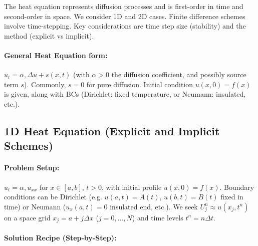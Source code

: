 \documentclass[a4paper,11pt]{report}
\begin{document}
The heat equation represents diffusion processes and is first-order in time and second-order in space. We consider 1D and 2D cases. Finite difference schemes involve time-stepping. Key considerations are time step size (stability) and the method (explicit vs implicit).
\paragraph{General Heat Equation form:}
$u_t = \alpha, \Delta u + s(x,t)$ (with $\alpha>0$ the diffusion coefficient, and possibly source term $s$). Commonly, $s=0$ for pure diffusion. Initial condition $u(x,0)=f(x)$ is given, along with BCs (Dirichlet: fixed temperature, or Neumann: insulated, etc.).
\subsection{1D Heat Equation (Explicit and Implicit Schemes)}
\paragraph{Problem Setup:}
$u_t = \alpha, u_{xx}$ for $x\in[a,b]$, $t>0$, with initial profile $u(x,0)=f(x)$. Boundary conditions can be Dirichlet (e.g. $u(a,t)=A(t)$, $u(b,t)=B(t)$ fixed in time) or Neumann ($u_x(a,t)=0$ insulated end, etc.). We seek $U_j^n \approx u(x_j, t^n)$ on a space grid $x_j = a + j\Delta x$ ($j=0,\dots,N$) and time levels $t^n = n\Delta t$.

\paragraph{Solution Recipe (Step-by-Step):}
\end{document}
